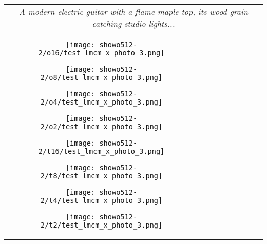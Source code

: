\begin{figure*}[htbp]
\begin{tabular}{cccccccc}
        \multicolumn{8}{c}{\small \textit{A modern electric guitar with a flame maple top, its wood grain catching studio lights...}} \\
        \vspace{0.1cm}



        \begin{minipage}{0.12\linewidth} 
            \centering
            \texttt{[image: showo512-2/o16/test\_lmcm\_x\_photo\_3.png]}
        \end{minipage} 
        \hspace{-0.15cm} %
        \begin{minipage}{0.12\linewidth} 
            \centering
            \texttt{[image: showo512-2/o8/test\_lmcm\_x\_photo\_3.png]}
        \end{minipage} 
        \hspace{-0.15cm}
        \begin{minipage}{0.12\linewidth} 
            \centering
            \texttt{[image: showo512-2/o4/test\_lmcm\_x\_photo\_3.png]}
        \end{minipage} 
        \hspace{-0.15cm}
        \begin{minipage}{0.12\linewidth} 
            \centering
            \texttt{[image: showo512-2/o2/test\_lmcm\_x\_photo\_3.png]}
        \end{minipage} 
        \hspace{0cm}
        \begin{minipage}{0.12\linewidth} 
            \centering
            \texttt{[image: showo512-2/t16/test\_lmcm\_x\_photo\_3.png]}
        \end{minipage} 
        \hspace{-0.15cm}
        \begin{minipage}{0.12\linewidth} 
            \centering
            \texttt{[image: showo512-2/t8/test\_lmcm\_x\_photo\_3.png]}
        \end{minipage} 
        \hspace{-0.15cm}
        \begin{minipage}{0.12\linewidth} 
            \centering
            \texttt{[image: showo512-2/t4/test\_lmcm\_x\_photo\_3.png]}
        \end{minipage} 
        \hspace{-0.15cm}
        \begin{minipage}{0.12\linewidth} 
            \centering
            \texttt{[image: showo512-2/t2/test\_lmcm\_x\_photo\_3.png]}
        \end{minipage} \\


\end{tabular}
\end{figure*}
